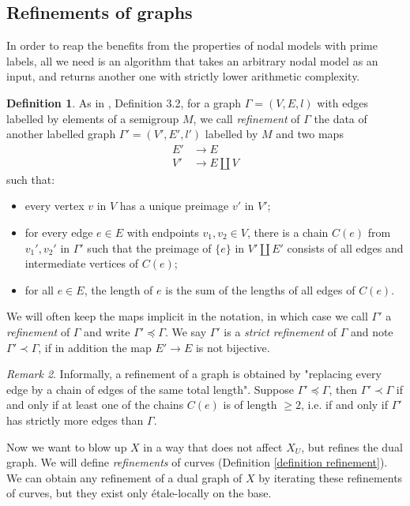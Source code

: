 \documentclass[a4paper,12pt]{amsart} %
\numberwithin{equation}{subsection}
\theoremstyle{definition}
\newtheorem{definition}{Definition}[section]
\theoremstyle{plain}%
\theoremstyle{remark}
\newtheorem{remark}[definition]{Remark}
\begin{document}
\subsection{Refinements of graphs}
In order to reap the benefits from the properties of nodal models with prime labels, all we need is an algorithm that takes an arbitrary nodal model as an input, and returns another one with strictly lower arithmetic complexity.

\begin{definition}\label{definition refinements of graphs}
	As in \cite{Holmes}, Definition 3.2, for a graph $\Gamma=(V,E,l)$ with edges labelled by elements of a semigroup $M$, we call \emph{refinement} of $\Gamma$ the data of another labelled graph $\Gamma'=(V',E',l')$ labelled by $M$ and two maps
\begin{align*}
E' & \to E \\
V' & \to E \coprod V
\end{align*}	
	such that:
	\begin{itemize}
	\item every vertex $v$ in $V$ has a unique preimage $v'$ in $V'$;
	\item for every edge $e\in E$ with endpoints $v_1,v_2\in V$, there is a chain $C(e)$ from $v_1',v_2'$ in $\Gamma'$ such that the preimage of $\{e\}$ in $V' \coprod E'$ consists of all edges and intermediate vertices of $C(e)$;
	\item for all $e\in E$, the length of $e$ is the sum of the lengths of all edges of $C(e)$.
	\end{itemize}
	We will often keep the maps implicit in the notation, in which case we call $\Gamma'$ a \emph{refinement} of $\Gamma$ and write $\Gamma'\preceq\Gamma$. We say $\Gamma'$ is a \emph{strict refinement} of $\Gamma$ and note $\Gamma'\prec\Gamma$, if in addition the map $E' \to E$ is not bijective.
\end{definition}

\begin{remark}
Informally, a refinement of a graph is obtained by "replacing every edge by a chain of edges of the same total length". Suppose $\Gamma'\preceq\Gamma$, then $\Gamma'\prec\Gamma$ if and only if at least one of the chains $C(e)$ is of length $\geq 2$, i.e. if and only if $\Gamma'$ has strictly more edges than $\Gamma$.
\end{remark}


Now we want to blow up $X$ in a way that does not affect $X_U$, but refines the dual graph. We will define \emph{refinements} of curves (Definition \ref{definition refinement}). We can obtain any refinement of a dual graph of $X$ by iterating these refinements of curves, but they exist only \'etale-locally on the base.
\end{document}
